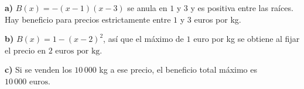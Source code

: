\textbf{a)} $B(x)=-(x-1)(x-3)$ se anula en $1$ y $3$ y es positiva entre las raíces. Hay beneficio para precios estrictamente entre $1$ y $3$ euros por kg.

\textbf{b)} $B(x)=1-(x-2)^2$, así que el máximo de $1$ euro por kg se obtiene al fijar el precio en $\boxed{2\text{ euros por kg}}$.

\textbf{c)} Si se venden los $10\,000$ kg a ese precio, el beneficio total máximo es $\boxed{10\,000\text{ euros}}$.
